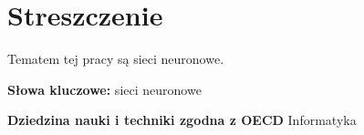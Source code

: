 \chapter{Streszczenie}

Tematem tej pracy są sieci neuronowe.

\bigskip

\noindent\textbf{Słowa kluczowe:} sieci neuronowe

\bigskip

\noindent\textbf{Dziedzina nauki i techniki zgodna z OECD} Informatyka
